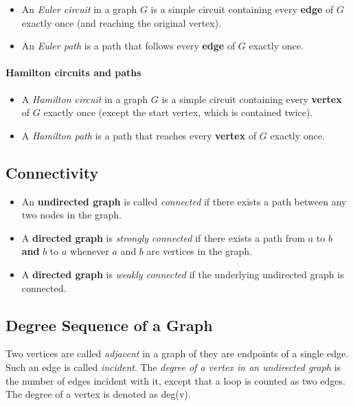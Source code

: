 \begin{itemize}
	\item An \emph{Euler circuit} in a graph \( G \) is a simple circuit containing every \textbf{edge}  of \( G \)  exactly once (and reaching the original vertex).
	\item An \emph{Euler path} is a path that follows every \textbf{edge} of \( G \) exactly once.
\end{itemize}

\paragraph{Hamilton circuits and paths} 
\begin{itemize}
	\item A \emph{Hamilton circuit} in a graph \( G \) is a simple circuit containing every \textbf{vertex}  of \( G \)  exactly once (except the start vertex, which is contained twice). 
	\item A \emph{Hamilton path} is a path that reaches every \textbf{vertex}  of \( G \) exactly once.
\end{itemize}


\subsection{Connectivity}

\begin{itemize}
	\item An \textbf{undirected graph}  is called \emph{connected} if there exists a path between any two nodes in the graph.
	\item A \textbf{directed graph}  is \emph{strongly connected} if there exists a path from \( a \) to \( b \) \textbf{and} \( b \) to \( a \) whenever \( a \) and \( b \) are vertices in the graph.
	\item A \textbf{directed graph}  is \emph{weakly connected} if the underlying undirected graph is connected.
\end{itemize}

\subsection{Degree Sequence of a Graph}

Two vertices are called \emph{adjacent} in a graph of they are endpoints of a single edge. Such an edge is called \emph{incident}. The \emph{degree of a vertex in an undirected graph} is the number of edges incident with it, except that a loop is counted as two edges. The degree of a vertex is denoted as deg(v).

